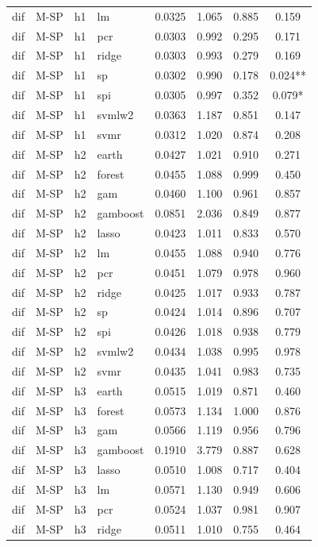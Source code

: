 \begin{ThreePartTable}
\begin{longtable}[t]{llclcccc}
dif & M-SP & h1 & lm & 0.0325 & 1.065 & 0.885 & 0.159\\
dif & M-SP & h1 & pcr & 0.0303 & 0.992 & 0.295 & 0.171\\
dif & M-SP & h1 & ridge & 0.0303 & 0.993 & 0.279 & 0.169\\
dif & M-SP & h1 & sp & 0.0302 & 0.990 & 0.178 & 0.024**\\
dif & M-SP & h1 & spi & 0.0305 & 0.997 & 0.352 & 0.079*\\
dif & M-SP & h1 & svmlw2 & 0.0363 & 1.187 & 0.851 & 0.147\\
dif & M-SP & h1 & svmr & 0.0312 & 1.020 & 0.874 & 0.208\\
\addlinespace
dif & M-SP & h2 & earth & 0.0427 & 1.021 & 0.910 & 0.271\\
dif & M-SP & h2 & forest & 0.0455 & 1.088 & 0.999 & 0.450\\
dif & M-SP & h2 & gam & 0.0460 & 1.100 & 0.961 & 0.857\\
dif & M-SP & h2 & gamboost & 0.0851 & 2.036 & 0.849 & 0.877\\
dif & M-SP & h2 & lasso & 0.0423 & 1.011 & 0.833 & 0.570\\
dif & M-SP & h2 & lm & 0.0455 & 1.088 & 0.940 & 0.776\\
dif & M-SP & h2 & pcr & 0.0451 & 1.079 & 0.978 & 0.960\\
dif & M-SP & h2 & ridge & 0.0425 & 1.017 & 0.933 & 0.787\\
dif & M-SP & h2 & sp & 0.0424 & 1.014 & 0.896 & 0.707\\
dif & M-SP & h2 & spi & 0.0426 & 1.018 & 0.938 & 0.779\\
dif & M-SP & h2 & svmlw2 & 0.0434 & 1.038 & 0.995 & 0.978\\
dif & M-SP & h2 & svmr & 0.0435 & 1.041 & 0.983 & 0.735\\
\addlinespace
dif & M-SP & h3 & earth & 0.0515 & 1.019 & 0.871 & 0.460\\
dif & M-SP & h3 & forest & 0.0573 & 1.134 & 1.000 & 0.876\\
dif & M-SP & h3 & gam & 0.0566 & 1.119 & 0.956 & 0.796\\
dif & M-SP & h3 & gamboost & 0.1910 & 3.779 & 0.887 & 0.628\\
dif & M-SP & h3 & lasso & 0.0510 & 1.008 & 0.717 & 0.404\\
dif & M-SP & h3 & lm & 0.0571 & 1.130 & 0.949 & 0.606\\
dif & M-SP & h3 & pcr & 0.0524 & 1.037 & 0.981 & 0.907\\
dif & M-SP & h3 & ridge & 0.0511 & 1.010 & 0.755 & 0.464\\

\end{longtable}
\end{ThreePartTable}
